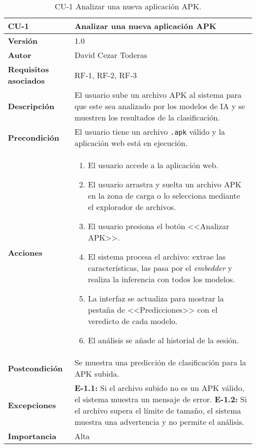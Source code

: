 
\begin{table}[H]
	\centering
	\begin{tabularx}{\linewidth}{ p{} p{} }
		\toprule
		\textbf{CU-1}    & \textbf{Analizar una nueva aplicación APK}\\
		\toprule
		\textbf{Versión}              & 1.0    \\
		\textbf{Autor}                & David Cezar Toderas \\
		\textbf{Requisitos asociados} & RF-1, RF-2, RF-3 \\
		\textbf{Descripción}          & El usuario sube un archivo APK al sistema para que este sea analizado por los modelos de IA y se muestren los resultados de la clasificación. \\
		\textbf{Precondición}         & El usuario tiene un archivo \texttt{.apk} válido y la aplicación web está en ejecución. \\
		\textbf{Acciones}             &
		\begin{enumerate}
			\def\labelenumi{\arabic{enumi}.}
			\tightlist
			\item El usuario accede a la aplicación web.
			\item El usuario arrastra y suelta un archivo APK en la zona de carga o lo selecciona mediante el explorador de archivos.
			\item El usuario presiona el botón <<Analizar APK>>.
			\item El sistema procesa el archivo: extrae las características, las pasa por el \textit{embedder} y realiza la inferencia con todos los modelos.
			\item La interfaz se actualiza para mostrar la pestaña de <<Predicciones>> con el veredicto de cada modelo.
			\item El análisis se añade al historial de la sesión.
		\end{enumerate}\\
		\textbf{Postcondición}        & Se muestra una predicción de clasificación para la APK subida. \\
		\textbf{Excepciones}          & \textbf{E-1.1:} Si el archivo subido no es un APK válido, el sistema muestra un mensaje de error. \newline \textbf{E-1.2:} Si el archivo supera el límite de tamaño, el sistema muestra una advertencia y no permite el análisis. \\
		\textbf{Importancia}          & Alta \\
		\bottomrule
	\end{tabularx}
	\caption{CU-1 Analizar una nueva aplicación APK.}
\end{table}


